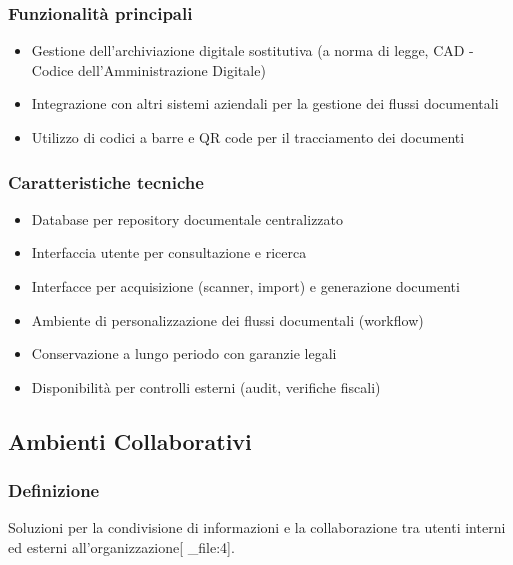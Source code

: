 \documentclass[12pt,a4paper]{article}
\begin{document}
\subsubsection{Funzionalità principali}
\begin{itemize}
    \item Gestione dell'archiviazione digitale sostitutiva (a norma di legge, CAD - Codice dell'Amministrazione Digitale)
    \item Integrazione con altri sistemi aziendali per la gestione dei flussi documentali
    \item Utilizzo di codici a barre e QR code per il tracciamento dei documenti
\end{itemize}

\subsubsection{Caratteristiche tecniche}
\begin{itemize}
    \item Database per repository documentale centralizzato
    \item Interfaccia utente per consultazione e ricerca
    \item Interfacce per acquisizione (scanner, import) e generazione documenti
    \item Ambiente di personalizzazione dei flussi documentali (workflow)
    \item Conservazione a lungo periodo con garanzie legali
    \item Disponibilità per controlli esterni (audit, verifiche fiscali)
\end{itemize}

\subsection{Ambienti Collaborativi}

\subsubsection{Definizione}
Soluzioni per la condivisione di informazioni e la collaborazione tra utenti interni ed esterni all'organizzazione[ _file:4].
\end{document}
